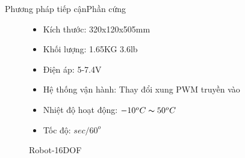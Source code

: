 \documentclass[compress, blue, 13pt,hyperref={pdfpagemode=FullScreen}]{beamer}
\begin{document}
\begin{frame}{Phương pháp tiếp cận}{Phần cứng}
\begin{figure}[hbtp]
\begin{multicols}{2}
\begin{itemize}
\item Kích thước: 320x120x505mm
\item Khối lượng: 1.65KG  3.6lb  
\vspace{0.4cm}
\item Điện áp: 5-7.4V
\item Hệ thống vận hành:  Thay đổi xung PWM truyền vào
\item Nhiệt độ hoạt động: $-10^{o}C\thicksim50^{o}C$
\item Tốc độ: $sec/60^{o}$  %
\end{itemize}
\end{multicols}
\caption{Robot-16DOF}
\end{figure}
\end{frame}
\end{document}
